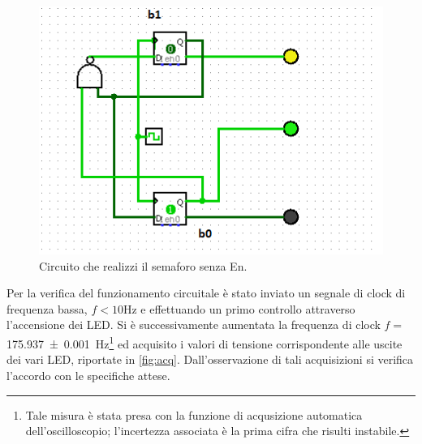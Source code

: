 \documentclass[a4paper,11pt]{article}
\begin{document}
\begin{figure}[h!]
		\centering
		\includegraphics[scale=1.0]{circ3.png}
		\caption{Circuito che realizzi il semaforo senza En.}
		\label{fig:sem2}
	\end{figure}

Per la verifica del funzionamento circuitale è stato 
 inviato un segnale di clock di frequenza bassa, $f<10 $\si{\hertz} e effettuando un primo controllo attraverso l'accensione dei LED. Si è successivamente aumentata la frequenza di clock $f= $\SI{175.937\pm 0.001}{\hertz}\footnote{Tale misura è stata presa con la funzione di acqusizione automatica dell'oscilloscopio;  l'incertezza associata è la prima cifra che risulti instabile.}
 ed acquisito i valori di tensione corrispondente alle uscite dei vari LED, riportate in 
 \figurename{ \ref{fig:acq}}. Dall'osservazione di
  tali acquisizioni si verifica l'accordo con le specifiche attese. 
 
\end{document}
